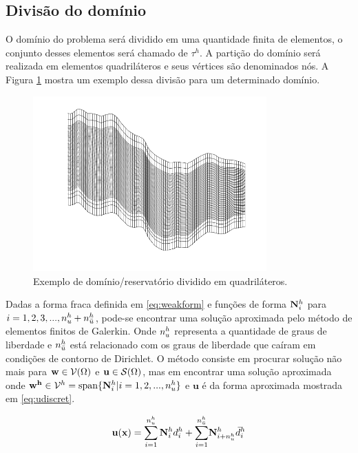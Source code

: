 \subsection{Divisão do domínio}

O domínio do problema será dividido em uma quantidade finita de elementos, o conjunto desses elementos será chamado de $\tau^h$.  A partição do domínio será realizada em elementos quadriláteros e seus vértices são denominados nós. A Figura \ref{fig:elemento} mostra um exemplo dessa divisão para um determinado domínio.

\begin{figure}[!htbp]
\centering
\includegraphics[width=0.8\textwidth]{chap01/figs/exemplo_dominio.png}
\caption{Exemplo de domínio/reservatório dividido em quadriláteros.}
\label{fig:elemento}
\end{figure}


Dadas a forma fraca definida em \eqref{eq:weakform} e funções de forma ${\mathbf{N}_{i}^h}$ para $i = 1, 2, 3, ..., n_u^h + n_{\bar{u}}^h$, pode-se encontrar uma solução aproximada pelo método de elementos finitos de Galerkin. Onde $n_u^h$ representa a quantidade de graus de liberdade e $n_{\bar{u}}^h$ está relacionado com os graus de liberdade que caíram em condições de contorno de Dirichlet. O método consiste em procurar solução não mais para $\mathbf{w} \in \mathcal{V}(\Omega)$ e $\mathbf{u} \in \mathcal{S}(\Omega)$, mas em encontrar uma solução aproximada onde  $\mathbf{w^h} \in \mathcal{V}^h = \text{span}\{ {\mathbf{N}_{i}^h} | i = 1,2, ..., n_u^h  \}$ e $\mathbf{u}$ é  da forma aproximada mostrada em \eqref{eq:udiscret}. 

\begin{equation}\label{eq:udiscret}
\mathbf{u}(\mathbf{x}) = \sum_{i=1}^{n_u^h} {\mathbf{N}_{i}^h}  d_i^h + {\sum_{i=1}^ {n^h_{\bar{u}}}}  \mathbf{N}_{i+n_u^h}^h \bar{d}_i^h
\end{equation}




